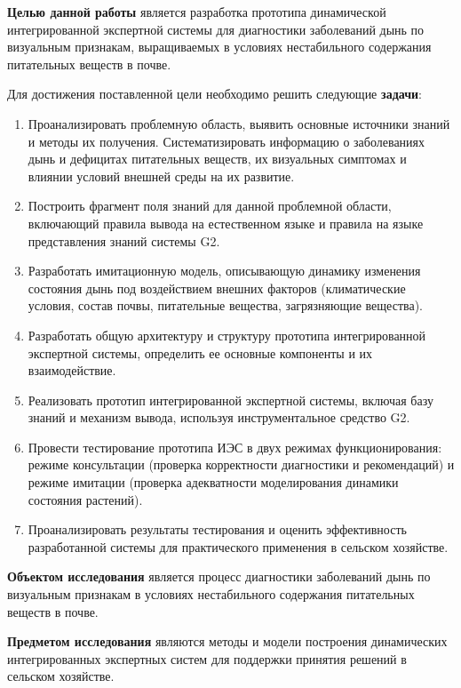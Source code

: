 \textbf{Целью данной работы} является разработка прототипа динамической интегрированной экспертной системы для диагностики заболеваний дынь по визуальным признакам, выращиваемых в условиях нестабильного содержания питательных веществ в почве.

Для достижения поставленной цели необходимо решить следующие \textbf{задачи}:
\begin{enumerate}
    \item Проанализировать проблемную область, выявить основные источники знаний и методы их получения. Систематизировать информацию о заболеваниях дынь и дефицитах питательных веществ, их визуальных симптомах и влиянии условий внешней среды на их развитие.
    \item Построить фрагмент поля знаний для данной проблемной области, включающий правила вывода на естественном языке и правила на языке представления знаний системы G2.
    \item Разработать имитационную модель, описывающую динамику изменения состояния дынь под воздействием внешних факторов (климатические условия, состав почвы, питательные вещества, загрязняющие вещества).
    \item Разработать общую архитектуру и структуру прототипа интегрированной экспертной системы, определить ее основные компоненты и их взаимодействие.
    \item Реализовать прототип интегрированной экспертной системы, включая базу знаний и механизм вывода, используя инструментальное средство G2.
    \item Провести тестирование прототипа ИЭС в двух режимах функционирования: режиме консультации (проверка корректности диагностики и рекомендаций) и режиме имитации (проверка адекватности моделирования динамики состояния растений).
    \item Проанализировать результаты тестирования и оценить эффективность разработанной системы для практического применения в сельском хозяйстве.
\end{enumerate}

\textbf{Объектом исследования} является процесс диагностики заболеваний дынь по визуальным признакам в условиях нестабильного содержания питательных веществ в почве.

\textbf{Предметом исследования} являются методы и модели построения динамических интегрированных экспертных систем для поддержки принятия решений в сельском хозяйстве.

